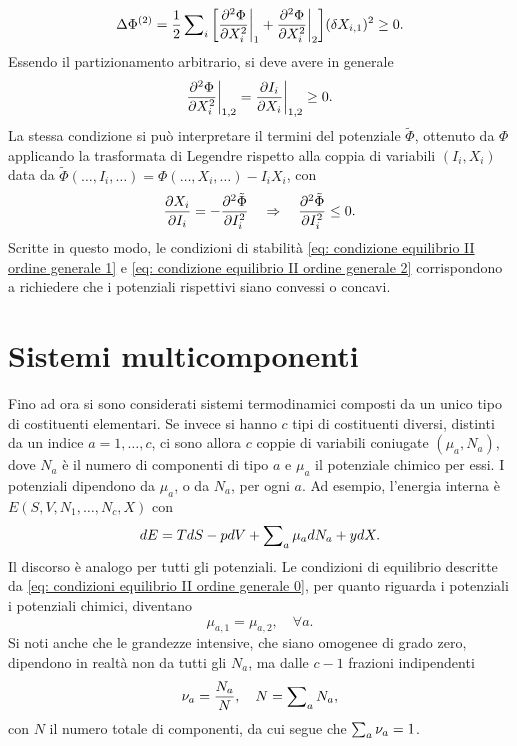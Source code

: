 \begin{equation}
\label{eq: condizioni equilibrio II ordine generale 0}
    \Delta\Phi^{(2)} = \frac{1}{2}\sum\nolimits_i\bigg[\frac{\partial^2\Phi}{\partial X_i^2}\bigg|_1 + \frac{\partial^2\Phi}{\partial X_i^2}\bigg|_2\bigg](\delta X_{i,1})^2 \ge 0.
\end{equation}
Essendo il partizionamento arbitrario, si deve avere in generale
\begin{equation}
\label{eq: condizione equilibrio II ordine generale 1}
    \frac{\partial^2\Phi}{\partial X_i^2}\bigg|_{1,2} = \frac{\partial I_i}{\partial X_i}\bigg|_{1,2} \ge 0.
\end{equation}
La stessa condizione si può interpretare il termini del potenziale $\tilde{\Phi}$, ottenuto da $\Phi$ applicando la trasformata di Legendre rispetto alla coppia di variabili $(I_i,X_i)$ data da $\tilde{\Phi}(\dots,I_i,\dots) = \Phi(\dots, X_i,\dots) - I_iX_i$, con
\begin{equation}
\label{eq: condizione equilibrio II ordine generale 2}
    \frac{\partial X_i}{\partial I_i} = -\frac{\partial^2\tilde{\Phi}}{\partial I_i^2}\quad\Rightarrow\quad\frac{\partial^2\tilde{\Phi}}{\partial I_i^2} \le 0.
\end{equation}
Scritte in questo modo, le condizioni di stabilità \eqref{eq: condizione equilibrio II ordine generale 1} e \eqref{eq: condizione equilibrio II ordine generale 2} corrispondono a richiedere che i potenziali rispettivi siano convessi o concavi.

\section{Sistemi multicomponenti}
Fino ad ora si sono considerati sistemi termodinamici composti da un unico tipo di costituenti elementari. Se invece si hanno $c$ tipi di costituenti diversi, distinti da un indice $a = 1,\dots,c$, ci sono allora $c$ coppie di variabili coniugate $(\mu_a,N_a)$, dove $N_a$ è il numero di componenti di tipo $a$ e $\mu_a$ il potenziale chimico per essi. I potenziali dipendono da $\mu_a$, o da $N_a$, per ogni $a$. Ad esempio, l'energia interna è $E(S,V,N_1,\dots,N_c,X)$ con 
\begin{equation}
    dE = TdS - pdV + \sum\nolimits_a\mu_adN_a + y dX.
\end{equation}
Il discorso è analogo per tutti gli potenziali. Le condizioni di equilibrio descritte da \eqref{eq: condizioni equilibrio II ordine generale 0}, per quanto riguarda i potenziali i potenziali chimici, diventano
\begin{equation}
    \mu_{a,1} = \mu_{a,2},\quad\forall a.
\end{equation}
Si noti anche che le grandezze intensive, che siano omogenee di grado zero, dipendono in realtà non da tutti gli $N_a$, ma dalle $c - 1$ frazioni indipendenti 
\begin{equation}
    \nu_a = \frac{N_a}{N},\quad N = \sum\nolimits_aN_a,
\end{equation}
con $N$ il numero totale di componenti, da cui segue che $\sum\nolimits_a\nu_a = 1$.

